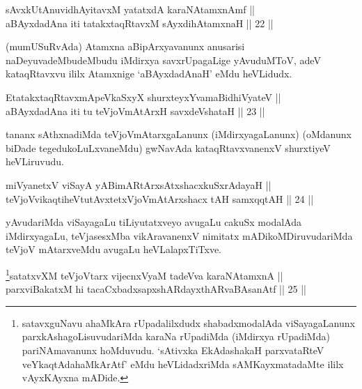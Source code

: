 
\begin{shl}
sAvxkUtAnuvidhAyitavxM yatatxdA karaNAtamxnAmf || \\
aBAyxdadAna iti tatakxtaqRtavxM sAyxdihA\s \s tamxnaH \hfill || 22 ||
  
\end{shl}

\begin{artha}
(mumUSuRvAda) Atamxna aBipArxyavanunx anusarisi naDeyuvadeMbudeMbudu
iMdirxya savxrUpagaLige yAvuduMToV, adeV kataqRtavxvu ililx Atamxnige
`aBAyxdadAnaH' eMdu heVLidudx.
\end{artha}

\begin{shl}
EtatakxtaqRtavxmApeVkaSxyX shurxteyxYvamaBidhiVyateV || \\
aBAyxdadAna iti tu teVjoVmAtArxH savxdeVshataH \hfill || 23 ||
  
\end{shl}

\begin{artha}
tananx sAthxnadiMda teVjoVmAtarxgaLanunx (iMdirxyagaLanunx) (oMdanunx
biDade tegedukoLuLxvaneMdu) gwNavAda kataqRtavxvanenxV shurxtiyeV
heVLiruvudu.
\end{artha}


\begin{shl}
miVyanetxV viSayA yABimARtArxsAtxshacxkuSxrAdayaH || \\
teVjoVvikaqtiheVtutAvxtetxVjoVmAtArxshacx tAH samxqqtAH \hfill || 24 ||
  
\end{shl}

\begin{artha}
yAvudariMda viSayagaLu tiLiyutatxveyo avugaLu cakuSx modalAda
iMdirxyagaLu, teVjasesxMba vikAravanenxV nimitatx mADikoMDiruvudariMda
teVjoV mAtarxveMdu avugaLu heVLalapxTiTxve.
\end{artha}



\begin{shl}
\footnote{satavxguNavu ahaMkAra rUpadalilxdudx shabadxmodalAda
viSayagaLanunx parxkAshagoLisuvudariMda karaNa rUpadiMda (iMdirxya
rUpadiMda) pariNAmavanunx hoMduvudu. `sAtivxka EkAdashakaH parxvataRteV veYkaqtAdahaMkArAtf' eMdu heVLidadxriMda
sAMKayxmatadaMte ililx vAyxKAyxna mADide.}satatxvXM teVjoV\s tarx vijecnxVyaM tadeVva karaNAtamxnA || \\
parxviBakatxM hi tacaCxbadxsapxshARdayxthARvaBAsanAtf \hfill || 25 ||
  
\end{shl}

